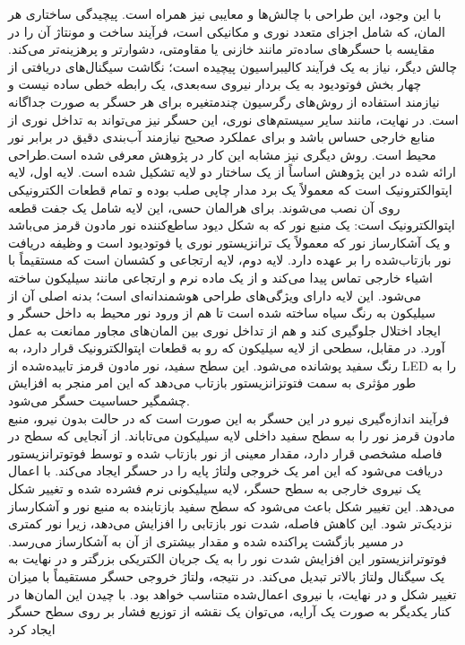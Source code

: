 با این وجود، این طراحی با چالش‌ها و معایبی نیز همراه است. پیچیدگی ساختاری هر المان، که شامل اجزای متعدد نوری و مکانیکی است، فرآیند ساخت و مونتاژ آن را در مقایسه با حسگرهای ساده‌تر مانند خازنی یا مقاومتی، دشوارتر و پرهزینه‌تر می‌کند. چالش دیگر، نیاز به یک فرآیند کالیبراسیون پیچیده است؛ نگاشت سیگنال‌های دریافتی از چهار بخش فوتودیود به یک بردار نیروی سه‌بعدی، یک رابطه خطی ساده نیست و نیازمند استفاده از روش‌های رگرسیون چندمتغیره برای هر حسگر به صورت جداگانه است. در نهایت، مانند سایر سیستم‌های نوری، این حسگر نیز می‌تواند به تداخل نوری از منابع خارجی حساس باشد و برای عملکرد صحیح نیازمند آب‌بندی دقیق در برابر نور محیط است.
\cite{khamis_novel_2019}
روش دیگری نیز مشابه این کار در پژوهش 
\cite{costanzo2021optical}
 معرفی شده است.طراحی ارائه شده در این پژوهش اساساً از یک ساختار دو لایه تشکیل شده است. لایه اول، لایه اپتوالکترونیک 
   است که معمولاً یک برد مدار چاپی صلب بوده و تمام قطعات الکترونیکی روی آن نصب می‌شوند. برای هرالمان حسی، این لایه شامل یک جفت قطعه اپتوالکترونیک است: یک منبع نور که به شکل دیود ساطع‌کننده نور مادون قرمز می‌باشد و یک آشکارساز نور که معمولاً یک ترانزیستور نوری
    یا فوتودیود است و وظیفه دریافت نور بازتاب‌شده را بر عهده دارد.
 لایه دوم، لایه ارتجاعی و کشسان است که مستقیماً با اشیاء خارجی تماس پیدا می‌کند و از یک ماده نرم و ارتجاعی مانند سیلیکون ساخته می‌شود. این لایه دارای ویژگی‌های طراحی هوشمندانه‌ای است؛ بدنه اصلی آن از سیلیکون به رنگ سیاه ساخته شده است تا هم از ورود نور محیط به داخل حسگر و ایجاد اختلال جلوگیری کند و هم از تداخل نوری
   بین المان‌های مجاور ممانعت به عمل آورد. در مقابل، سطحی از لایه سیلیکون که رو به قطعات اپتوالکترونیک قرار دارد، به رنگ سفید پوشانده می‌شود. این سطح سفید، نور مادون قرمز تابیده‌شده از LED را به طور مؤثری به سمت فتوتزانزیستور بازتاب می‌دهد که این امر منجر به افزایش چشمگیر حساسیت حسگر می‌شود.
\\
 فرآیند اندازه‌گیری نیرو در این حسگر به این صورت است که در حالت بدون نیرو، منبع مادون قرمز نور را به سطح سفید داخلی لایه سیلیکون می‌تاباند. از آنجایی که سطح در فاصله مشخصی قرار دارد، مقدار معینی از نور بازتاب شده و توسط فوتوترانزیستور دریافت می‌شود که این امر یک خروجی ولتاژ پایه را در حسگر ایجاد می‌کند. با اعمال یک نیروی خارجی به سطح حسگر، لایه سیلیکونی نرم فشرده شده و تغییر شکل می‌دهد. این تغییر شکل باعث می‌شود که سطح سفید بازتابنده به منبع نور و آشکارساز نزدیک‌تر شود. این کاهش فاصله، شدت نور بازتابی را افزایش می‌دهد، زیرا نور کمتری در مسیر بازگشت پراکنده شده و مقدار بیشتری از آن به آشکارساز می‌رسد. فوتوترانزیستور این افزایش شدت نور را به یک جریان الکتریکی بزرگتر و در نهایت به یک سیگنال ولتاژ بالاتر تبدیل می‌کند. در نتیجه، ولتاژ خروجی حسگر مستقیماً با میزان تغییر شکل و در نهایت، با نیروی اعمال‌شده متناسب خواهد بود. با چیدن این المان‌ها در کنار یکدیگر به صورت یک آرایه، می‌توان یک نقشه از توزیع فشار بر روی سطح حسگر ایجاد کرد
